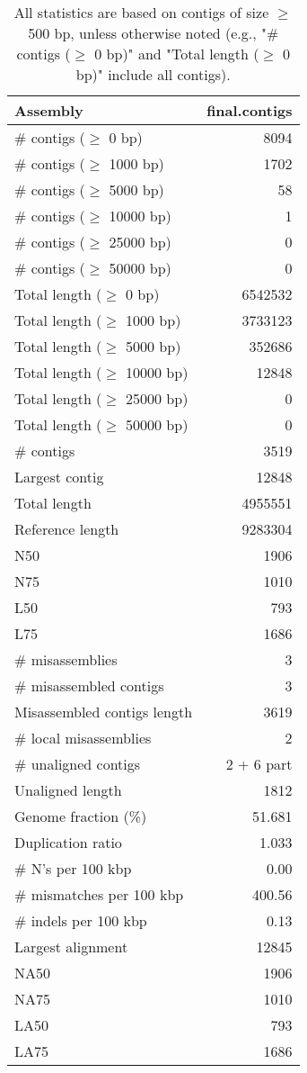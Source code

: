 \documentclass[12pt,a4paper]{article}
\begin{document}
\begin{table}[ht]
\begin{center}
\caption{All statistics are based on contigs of size $\geq$ 500 bp, unless otherwise noted (e.g., "\# contigs ($\geq$ 0 bp)" and "Total length ($\geq$ 0 bp)" include all contigs).}
\begin{tabular}{|l*{1}{|r}|}
\hline
Assembly & final.contigs \\ \hline
\# contigs ($\geq$ 0 bp) & 8094 \\ \hline
\# contigs ($\geq$ 1000 bp) & 1702 \\ \hline
\# contigs ($\geq$ 5000 bp) & 58 \\ \hline
\# contigs ($\geq$ 10000 bp) & 1 \\ \hline
\# contigs ($\geq$ 25000 bp) & 0 \\ \hline
\# contigs ($\geq$ 50000 bp) & 0 \\ \hline
Total length ($\geq$ 0 bp) & 6542532 \\ \hline
Total length ($\geq$ 1000 bp) & 3733123 \\ \hline
Total length ($\geq$ 5000 bp) & 352686 \\ \hline
Total length ($\geq$ 10000 bp) & 12848 \\ \hline
Total length ($\geq$ 25000 bp) & 0 \\ \hline
Total length ($\geq$ 50000 bp) & 0 \\ \hline
\# contigs & 3519 \\ \hline
Largest contig & 12848 \\ \hline
Total length & 4955551 \\ \hline
Reference length & 9283304 \\ \hline
N50 & 1906 \\ \hline
N75 & 1010 \\ \hline
L50 & 793 \\ \hline
L75 & 1686 \\ \hline
\# misassemblies & 3 \\ \hline
\# misassembled contigs & 3 \\ \hline
Misassembled contigs length & 3619 \\ \hline
\# local misassemblies & 2 \\ \hline
\# unaligned contigs & 2 + 6 part \\ \hline
Unaligned length & 1812 \\ \hline
Genome fraction (\%) & 51.681 \\ \hline
Duplication ratio & 1.033 \\ \hline
\# N's per 100 kbp & 0.00 \\ \hline
\# mismatches per 100 kbp & 400.56 \\ \hline
\# indels per 100 kbp & 0.13 \\ \hline
Largest alignment & 12845 \\ \hline
NA50 & 1906 \\ \hline
NA75 & 1010 \\ \hline
LA50 & 793 \\ \hline
LA75 & 1686 \\ \hline
\end{tabular}
\end{center}
\end{table}
\end{document}
